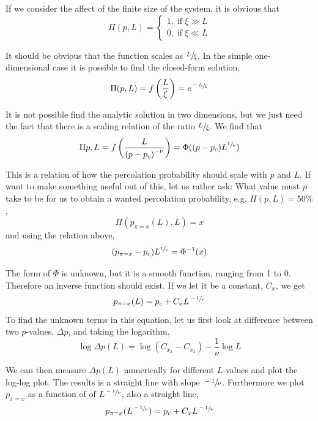 \documentclass[11pt]{article}
\numberwithin{equation}{section}
\numberwithin{figure}{section}
\begin{document}
If we consider the affect of the finite size of the system,
it is obvious that
\begin{equation}
	\Pi(p,L) =
	\begin{cases}
		1, \; \text{if} \; \xi \gg L\\
		0, \; \text{if} \; \xi \ll L
	\end{cases}
\end{equation}

It should be obvious that the function scales as
$\sfrac{L}{\xi}$. In the simple one-dimensional case
it is possible to find the closed-form solution,
\begin{equation}
    \Pi(p,L) = f\left(\frac{L}{\xi}\right) = e^{\sfrac{-L}{\xi}}
\end{equation}

It is not possible find the analytic solution in two dimensions,
but we just need the fact that there is a scaling relation
of the ratio $\sfrac{L}{\xi}$. We find that
\begin{equation}
    \Pi{p,L} = f\left(\frac{L}{{(p-p_c)}^{-\nu}}\right)
    = \Phi((p-p_c)L^{\sfrac{1}{\nu}})
\end{equation}

This is a relation of how the percolation probability
should scale with $p$ and $L$.
If want to make something useful out of this,
let us rather ask: What value must $p$ take to be for us to obtain
a wanted percolation probability, e.g. $\Pi(p,L) = 50 \%$,
\begin{equation}
    \Pi(p_{\pi = x}(L), L) = x
\end{equation}
and using the relation above,
\begin{equation}
    (p_{\pi=x}-p_c)L^{\sfrac{1}{\nu}} = \Phi^{-1}(x)
\end{equation}

The form of $\Phi$ is unknown, but it is a smooth function,
ranging from 1 to 0. Therefore an inverse function should exist.
If we let it be a constant, $C_x$, we get
\begin{equation}
    p_{\pi=x}(L) = p_c + C_x L^{\sfrac{-1}{\nu}}
\end{equation}
To find the unknown terms in this equation, let us first look
at difference between two $p$-values, $\Delta p$, and
taking the logarithm,
\begin{equation}
    \log \Delta p(L) = \log(C_{x_2}-C_{x_2})-\frac{1}{\nu}\log L
\end{equation}

We can then measure $\Delta p(L)$ numerically
for different $L$-values and plot
the log-log plot. The results is a
straight line with slope $\sfrac{-1}{\nu}$.
Furthermore we plot $p_{\pi = x}$ as a function of
of $L^{\sfrac{-1}{\nu}}$, also a straight line,
\begin{equation}
    p_{\pi=x}(L^{\sfrac{-1}{\nu}}) = p_c + C_x L^{\sfrac{-1}{\nu}}
\end{equation}
\end{document}
